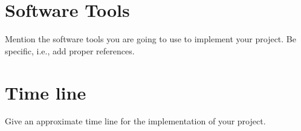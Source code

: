 \documentclass[runningheads]{llncs}
\begin{document}
\section{Software Tools}
Mention the software tools you are going to use to implement your project. Be specific, i.e., add proper references.

\section{Time line}
Give an approximate time line for the implementation of your project.






\end{document}
